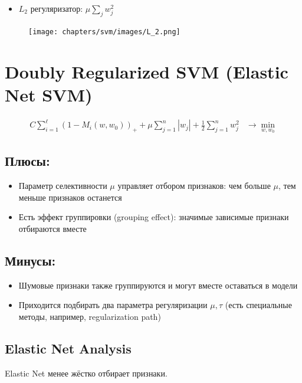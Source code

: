 \begin{itemize}
    \item \(L_2\) регуляризатор: \(\mu \sum_{j} w_j^2\)
\end{itemize}

\begin{figure}[ht]
    \centering
    \texttt{[image: chapters/svm/images/L\_2.png]}
    \label{fig:image_2}    
\end{figure}

\section{Doubly Regularized SVM (Elastic Net SVM)}

\begin{align*}
    C \sum_{i=1}^{\ell} \left(1 - M_i(w, w_0)\right)_+ + \mu \sum_{j=1}^{n} |w_j| + \frac{1}{2} \sum_{j=1}^{n} w_j^2 & \rightarrow \min_{w, w_0}
\end{align*}

\subsection*{Плюсы:}
\begin{itemize}
    \item Параметр селективности \(\mu\) управляет отбором признаков: чем больше \(\mu\), тем меньше признаков останется
    \item Есть эффект группировки (grouping effect): значимые зависимые признаки отбираются вместе
\end{itemize}

\subsection*{Минусы:}
\begin{itemize}
    \item Шумовые признаки также группируются и могут вместе оставаться в модели
    \item Приходится подбирать два параметра регуляризации \(\mu, \tau\) (есть специальные методы, например, regularization path)
\end{itemize}

\subsection{Elastic Net Analysis}

Elastic Net менее жёстко отбирает признаки.

